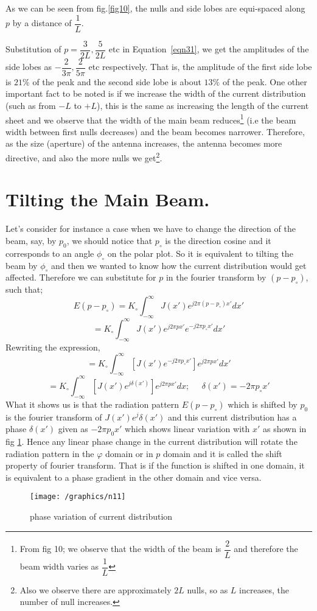 As we can be seen from fig.\ref{fig10}, the nulls and side lobes are equi-spaced along $p$ by a distance of $\dfrac{1}{L}$.

Substitution of $p = \dfrac{3}{2L}, \dfrac{5}{2L}$ etc in Equation~\ref{eqn31}, we get the amplitudes of the side lobes as $-\dfrac{2}{3\pi}, \dfrac{2}{5\pi}$ etc respectively. That is, the amplitude of the first side lobe is $21\% $ of the peak and the second side lobe is about $13\%$ of the peak. One other important fact to be noted is if we increase the width of the current distribution (such as from $-L$ to $+L$), this is the same as increasing the length of the current sheet and we observe that the width of the main beam reduces\footnote{From fig 10; we observe that the width of the beam is $\dfrac{2}{L}$ and therefore the beam width varies as $\dfrac{1}{L}$} (i.e the beam width between first nulls decreases) and the beam becomes narrower. Therefore, as the size (aperture) of the antenna increases, the antenna becomes more directive, and also the more nulls we get\footnote{Also we observe there are approximately $2L$ nulls, so as $L$ increases, the number of null increases.}.

\section{Tilting the Main Beam.}
Let's consider for instance a case when we have to change the direction of the beam, say, by $p_0$, we should notice that $p_\circ$ is the direction cosine and it corresponds to an angle $\phi_\circ$ on the polar plot. So it is equivalent to tilting the beam by $\phi_\circ$ and then we wanted to know how the current distribution would get affected. Therefore we can substitute for $p$ in the fourier transform by $(p - p_\circ)$, such that;
$$E(p - p_\circ) = K_\circ\int_{-\infty}^{\infty} J(x') e^{j2\pi (p - p_\circ)x'} dx'$$
$$= K_\circ\int_{-\infty}^{\infty} J(x') e^{j2\pi px'}  e^{-j2\pi p_\circ x'} dx'$$
Rewriting the expression,
$$= K_\circ\int_{-\infty}^{\infty} [J(x') e^{-j2\pi p_\circ x'}] e^{j2\pi px'} dx'$$
$$ = K_\circ\int_{-\infty}^{\infty} [J(x') e^{j\delta (x')}] e^{j2\pi px'} dx ;\; \; \; \; \; \delta(x') = -2\pi p_\circ x'$$
What it shows us is that the radiation pattern $E(p - p_\circ)$ which is shifted by $p_0$ is the fourier transform of  $J(x')e^j\delta(x')$ and this current distribution has a phase $\delta(x')$ given as $-2\pi p_0x'$ which shows linear variation with $x'$ as shown in fig \ref{fig11}. Hence any linear phase change in the current distribution will rotate the radiation pattern in the $\varphi$ domain or in $p$ domain and it is called the shift property of fourier transform. That is if the function is shifted in one domain, it is equivalent to a phase gradient in the other domain and vice versa.
\begin{figure}[h]
\centering
\texttt{[image: /graphics/n11]}
\caption{phase variation of current distribution}
\label{fig11}
\end{figure}

